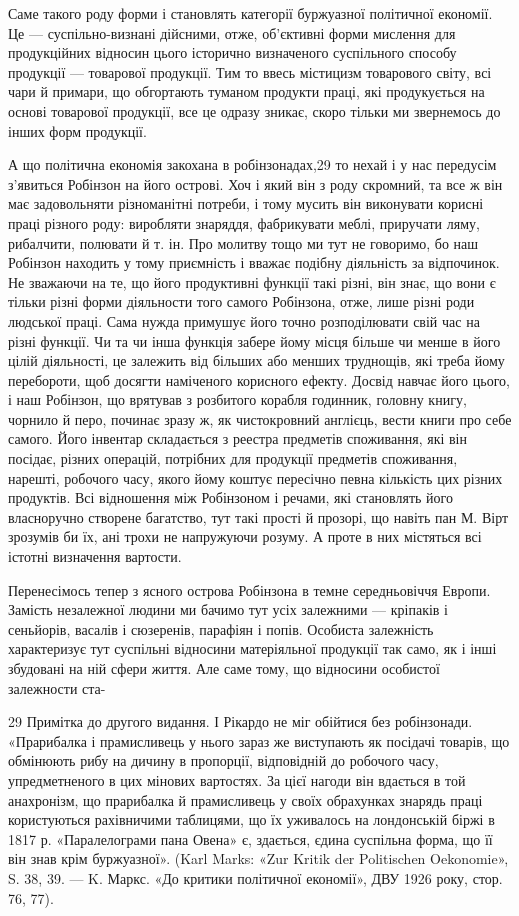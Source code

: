 Саме такого роду форми і становлять категорії буржуазної
політичної економії. Це — суспільно-визнані дійсними, отже,
об’єктивні форми мислення для продукційних відносин цього
історично визначеного суспільного способу продукції — товарової
продукції. Тим то ввесь містицизм товарового світу, всі чари й
примари, що обгортають туманом продукти праці, які продукується
на основі товарової продукції, все це одразу зникає, скоро
тільки ми звернемось до інших форм продукції.

А що політична економія закохана в робінзонадах,29 то нехай
і у нас передусім з’явиться Робінзон на його острові. Хоч і який
він з роду скромний, та все ж він має задовольняти різноманітні
потреби, і тому мусить він виконувати корисні праці різного
роду: виробляти знаряддя, фабрикувати меблі, приручати ляму,
рибалчити, полювати й т. ін. Про молитву тощо ми тут не говоримо,
бо наш Робінзон находить у тому приємність і вважає подібну
діяльність за відпочинок. Не зважаючи на те, що його продуктивні
функції такі різні, він знає, що вони є тільки різні форми
діяльности того самого Робінзона, отже, лише різні роди людської
праці. Сама нужда примушує його точно розподілювати свій час
на різні функції. Чи та чи інша функція забере йому місця більше
чи менше в його цілій діяльності, це залежить від більших або
менших труднощів, які треба йому перебороти, щоб досягти наміченого
корисного ефекту. Досвід навчає його цього, і наш Робінзон,
що врятував з розбитого корабля годинник, головну книгу,
чорнило й перо, починає зразу ж, як чистокровний англієць, вести
книги про себе самого. Його інвентар складається з реестра предметів
споживання, які він посідає, різних операцій, потрібних для
продукції предметів споживання, нарешті, робочого часу, якого
йому коштує пересічно певна кількість цих різних продуктів. Всі
відношення між Робінзоном і речами, які становлять його власноручно
створене багатство, тут такі прості й прозорі, що навіть
пан М. Вірт зрозумів би їх, ані трохи не напружуючи розуму.
А проте в них містяться всі істотні визначення вартости.

Перенесімось тепер з ясного острова Робінзона в темне середньовіччя
Европи. Замість незалежної людини ми бачимо тут усіх
залежними — кріпаків і сеньйорів, васалів і сюзеренів, парафіян
і попів. Особиста залежність характеризує тут суспільні відносини
матеріяльної продукції так само, як і інші збудовані на ній сфери
життя. Але саме тому, що відносини особистої залежности ста-

29 Примітка до другого видання. І Рікардо не міг обійтися без робінзонади.
«Прарибалка і прамисливець у нього зараз же виступають
як посідачі товарів, що обмінюють рибу на дичину в пропорції, відповідній
до робочого часу, упредметненого в цих мінових вартостях. За цієї
нагоди він вдається в той анахронізм, що прарибалка й прамисливець
у своїх обрахунках знарядь праці користуються рахівничими таблицями,
що їх уживалось на лондонській біржі в 1817 р. «Паралелограми пана
Овена» є, здається, єдина суспільна форма, що її він знав крім буржуазної».
(Karl Marks: «Zur Kritik der Politischen Oekonomie», S. 38, 39. —
K. Маркс. «До критики політичної економії», ДВУ 1926 року,
стор. 76, 77).

